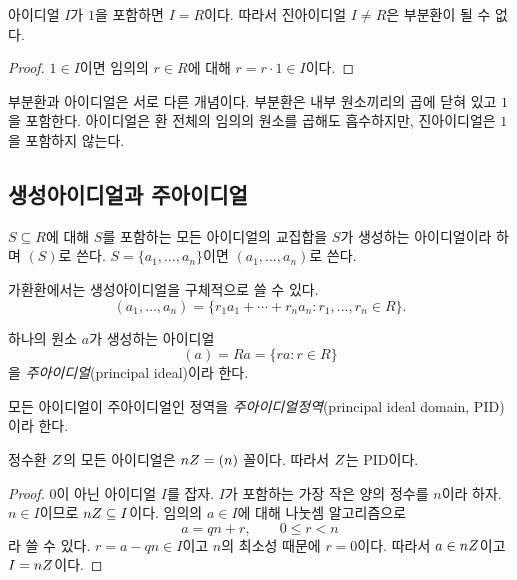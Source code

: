 \begin{proposition}
아이디얼 $I$가 $1$을 포함하면 $I=R$이다. 따라서 진아이디얼 $I\ne R$은 부분환이 될 수 없다.
\end{proposition}

\begin{proof}
$1\in I$이면 임의의 $r\in R$에 대해 $r=r\cdot1\in I$이다.
\end{proof}

\begin{pitfall}
부분환과 아이디얼은 서로 다른 개념이다. 부분환은 내부 원소끼리의 곱에 닫혀 있고 $1$을 포함한다. 아이디얼은 환 전체의 임의의 원소를 곱해도 흡수하지만, 진아이디얼은 $1$을 포함하지 않는다.
\end{pitfall}

\subsection{생성아이디얼과 주아이디얼}

\begin{definition}[생성아이디얼]
$S\subseteq R$에 대해 $S$를 포함하는 모든 아이디얼의 교집합을 $S$가 생성하는 아이디얼이라 하며 $(S)$로 쓴다. $S=\{a_1,\dots,a_n\}$이면 $(a_1,\dots,a_n)$로 쓴다.
\end{definition}

가환환에서는 생성아이디얼을 구체적으로 쓸 수 있다.
\[
  (a_1,\dots,a_n)
  =\{r_1a_1+\cdots+r_na_n:r_1,\dots,r_n\in R\}.
\]

\begin{definition}[주아이디얼]
하나의 원소 $a$가 생성하는 아이디얼
\[
  (a)=Ra=\{ra:r\in R\}
\]
을 \emph{주아이디얼}(principal ideal)이라 한다.
\end{definition}

\begin{definition}[주아이디얼정역]
모든 아이디얼이 주아이디얼인 정역을 \emph{주아이디얼정역}(principal ideal domain, PID)이라 한다.
\end{definition}

\begin{theorem}
정수환 $Z$의 모든 아이디얼은 $nZ=(n)$ 꼴이다. 따라서 $Z$는 PID이다.
\end{theorem}

\begin{proof}
$0$이 아닌 아이디얼 $I$를 잡자. $I$가 포함하는 가장 작은 양의 정수를 $n$이라 하자. $n\in I$이므로 $nZ\subseteq I$이다. 임의의 $a\in I$에 대해 나눗셈 알고리즘으로
\[
  a=qn+r,\qquad 0\le r<n
\]
라 쓸 수 있다. $r=a-qn\in I$이고 $n$의 최소성 때문에 $r=0$이다. 따라서 $a\in nZ$이고 $I=nZ$이다.
\end{proof}

